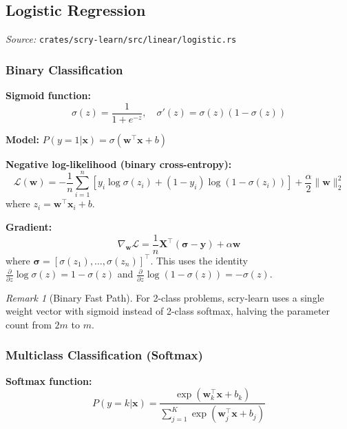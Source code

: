 \documentclass[11pt,a4paper]{article}
\theoremstyle{definition}
\theoremstyle{remark}
\newtheorem{remark}[theorem]{Remark}
\begin{document}
\subsection{Logistic Regression}
\label{sec:logreg}

\noindent\textit{Source:} \texttt{crates/scry-learn/src/linear/logistic.rs}

\subsubsection*{Binary Classification}

\textbf{Sigmoid function:}
\begin{equation}
\sigma(z) = \frac{1}{1 + e^{-z}}, \quad \sigma'(z) = \sigma(z)(1 - \sigma(z))
\end{equation}

\textbf{Model:} $P(y=1|\mathbf{x}) = \sigma(\mathbf{w}^\top\mathbf{x} + b)$

\textbf{Negative log-likelihood (binary cross-entropy):}
\begin{equation}
\mathcal{L}(\mathbf{w}) = -\frac{1}{n}\sum_{i=1}^n \left[y_i\log\sigma(z_i) + (1-y_i)\log(1-\sigma(z_i))\right] + \frac{\alpha}{2}\|\mathbf{w}\|_2^2
\end{equation}
where $z_i = \mathbf{w}^\top\mathbf{x}_i + b$.

\textbf{Gradient:}
\begin{equation}
\nabla_\mathbf{w}\mathcal{L} = \frac{1}{n}\mathbf{X}^\top(\boldsymbol{\sigma} - \mathbf{y}) + \alpha\mathbf{w}
\end{equation}
where $\boldsymbol{\sigma} = [\sigma(z_1), \ldots, \sigma(z_n)]^\top$. This uses the identity $\frac{\partial}{\partial z}\log\sigma(z) = 1 - \sigma(z)$ and $\frac{\partial}{\partial z}\log(1-\sigma(z)) = -\sigma(z)$.

\begin{remark}[Binary Fast Path]
For 2-class problems, scry-learn uses a single weight vector with sigmoid instead of 2-class softmax, halving the parameter count from $2m$ to $m$.
\end{remark}

\subsubsection*{Multiclass Classification (Softmax)}

\textbf{Softmax function:}
\begin{equation}
P(y=k|\mathbf{x}) = \frac{\exp(\mathbf{w}_k^\top\mathbf{x} + b_k)}{\sum_{j=1}^K\exp(\mathbf{w}_j^\top\mathbf{x} + b_j)}
\end{equation}
\end{document}
